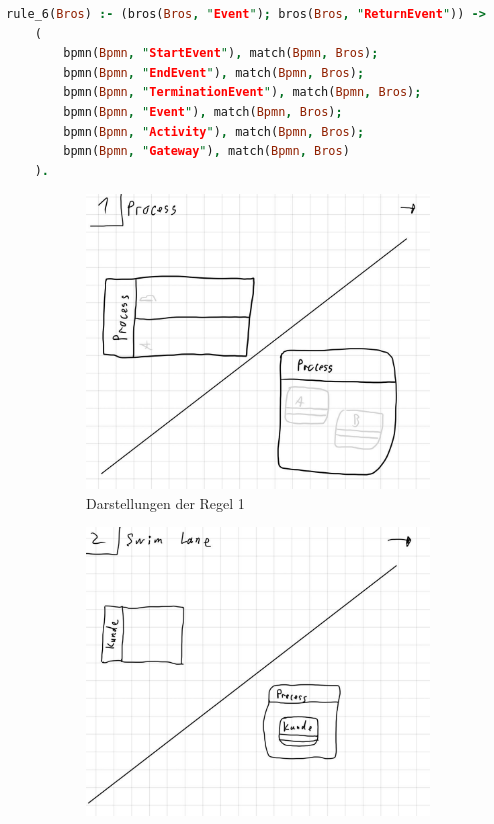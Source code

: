 \begin{lstlisting}[language=Prolog, caption=Formalisierung der Regel 6, label=lst:rule_6]
rule_6(Bros) :- (bros(Bros, "Event"); bros(Bros, "ReturnEvent")) ->
    (
        bpmn(Bpmn, "StartEvent"), match(Bpmn, Bros);
        bpmn(Bpmn, "EndEvent"), match(Bpmn, Bros);
        bpmn(Bpmn, "TerminationEvent"), match(Bpmn, Bros);
        bpmn(Bpmn, "Event"), match(Bpmn, Bros);
        bpmn(Bpmn, "Activity"), match(Bpmn, Bros);
        bpmn(Bpmn, "Gateway"), match(Bpmn, Bros)
    ).
\end{lstlisting}

\begin{figure}
    \centering
    \begin{subfigure}{0.4\textwidth}
        \centering
        \includegraphics[width=\textwidth,keepaspectratio]{../images/rule/rule1.jpg}%
        \caption{Darstellungen der Regel 1}%
        \label{fig:ruleExample1}
    \end{subfigure}
    \hfill
    \begin{subfigure}{0.4\textwidth}
        \centering
        \includegraphics[width=\textwidth,keepaspectratio]{../images/rule/rule2.jpg}%

\end{subfigure}
\end{figure}
